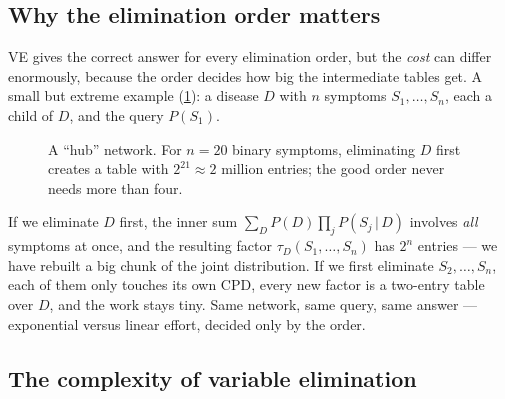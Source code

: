 \documentclass[11pt, oneside]{book}
\newcommand{\Prob}{\mathbb{P}}           %
\newcommand{\given}{\,\vert\,}           %
\let\originalsubsection\subsection
\renewcommand{\subsection}{\Needspace{6\baselineskip}\originalsubsection}
\begin{document}
\subsection{Why the elimination order matters}

VE gives the correct answer for every elimination order, but the
\emph{cost} can differ enormously, because the order decides how big the
intermediate tables get. A small but extreme example
(\cref{fig:hub}): a disease $D$ with $n$ symptoms $S_1, \ldots, S_n$, each a
child of $D$, and the query $P(S_1)$.

\begin{figure}[htbp]
\centering
{}
\caption{A ``hub'' network. For $n = 20$ binary symptoms, eliminating $D$
first creates a table with $2^{21} \approx 2$ million entries; the good order
never needs more than four.}
\label{fig:hub}
\end{figure}

If we eliminate $D$ first, the inner sum $\sum_D P(D) \prod_j P(S_j \given
D)$ involves \emph{all} symptoms at once, and the resulting factor
$\tau_D(S_1, \ldots, S_n)$ has $2^n$ entries --- we have rebuilt a big chunk
of the joint distribution. If we first eliminate $S_2, \ldots, S_n$, each of
them only touches its own CPD, every new factor is a two-entry table over
$D$, and the work stays tiny. Same network, same query, same answer ---
exponential versus linear effort, decided only by the order.

\subsection{The complexity of variable elimination}
\end{document}
